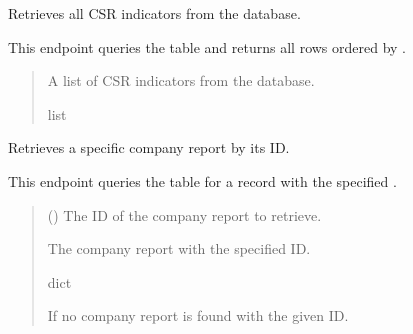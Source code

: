 \documentclass[letterpaper,10pt,english]{sphinxmanual}
\begin{document}
\begin{fulllineitems}
\label{\detokenize{my_fastapi:my_fastapi.main.get_all_indicators}}
\pysigstartsignatures
\pysiglinewithargsret
{}
{}
{}
\pysigstopsignatures
\sphinxAtStartPar
Retrieves all CSR indicators from the database.

\sphinxAtStartPar
This endpoint queries the  table and returns all rows ordered by .
\begin{quote}\begin{description}
\sphinxAtStartPar
A list of CSR indicators from the database.

\sphinxAtStartPar
list

\end{description}\end{quote}

\end{fulllineitems}


\begin{fulllineitems}
\label{\detokenize{my_fastapi:my_fastapi.main.get_company_report_by_id}}
\pysigstartsignatures
\pysiglinewithargsret
{}
{}
{}
\pysigstopsignatures
\sphinxAtStartPar
Retrieves a specific company report by its ID.

\sphinxAtStartPar
This endpoint queries the  table for a record with the specified .
\begin{quote}\begin{description}
\sphinxAtStartPar
{} () \textendash{} The ID of the company report to retrieve.

\sphinxAtStartPar
The company report with the specified ID.

\sphinxAtStartPar
dict

\sphinxAtStartPar
{} \textendash{} If no company report is found with the given ID.

\end{description}\end{quote}

\end{fulllineitems}
\end{document}

